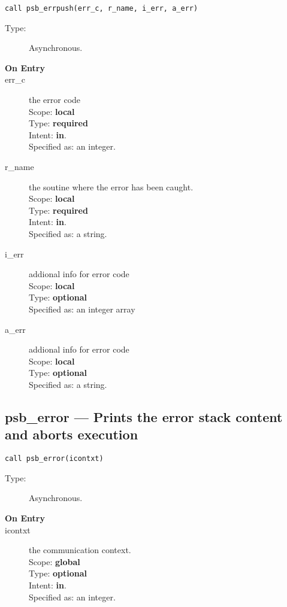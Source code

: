 \begin{lstlisting}
call psb_errpush(err_c, r_name, i_err, a_err)
\end{lstlisting}

\begin{description}
\item[Type:] Asynchronous.
\item[\bf On Entry]
\item[err\_c] the error code\\
Scope: {\bf local} \\
Type: {\bf required}\\
Intent: {\bf in}.\\
Specified as: an integer.
\item[r\_name] the soutine where the error has been caught.\\
Scope: {\bf local} \\
Type: {\bf required}\\
Intent: {\bf in}.\\
Specified as: a string.\\
\item[i\_err] addional info for error code\\
Scope: {\bf local} \\
Type: {\bf optional}\\
Specified as: an integer array\\
\item[a\_err] addional info for error code\\
Scope: {\bf local} \\
Type: {\bf optional}\\
Specified as: a string.\\
\end{description}

\clearpage\subsection{psb\_error --- Prints the error stack content and aborts
  execution}

\begin{lstlisting}
call psb_error(icontxt)
\end{lstlisting}

\begin{description}
\item[Type:] Asynchronous.
\item[\bf On Entry]
\item[icontxt] the communication context.\\
Scope: {\bf global} \\
Type: {\bf optional}\\
Intent: {\bf in}.\\
Specified as: an integer.
\end{description}



